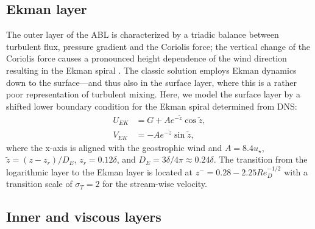 \documentclass[smallcondensed,draft]{svjour3} %
\begin{document}


\subsection{Ekman layer}
\label{sec:ekmanlayer}
The outer layer of the ABL is characterized by a triadic balance between turbulent flux, pressure gradient and the Coriolis force; the vertical change of the Coriolis force causes a pronounced height dependence of the wind direction resulting in the Ekman spiral \citep{ekman:AMA1905}. The classic solution employs Ekman dynamics down to the surface---and thus also in the surface layer, where this is a rather poor representation of turbulent mixing. Here, we model the surface layer by a shifted lower boundary condition for the Ekman spiral determined from DNS:
\begin{subequations}
  \begin{align}
    U_{EK} &= G + Ae^{-\tilde{z}}\cos\tilde{z},\\
		V_{EK} &= - Ae^{-\tilde{z}}\sin\tilde{z},
  \end{align}
\end{subequations}
where the x-axis is aligned with the geostrophic wind and $A = 8.4u_\star$, $\tilde{z} = (z-z_r)/D_E$, $z_r = 0.12\delta$, and $D_E = 3\delta/4\pi\approx 0.24\delta$. The transition from the logarithmic layer to the Ekman layer is located at $z^{-}=0.28- 2.25 Re_{D}^{-1/2}$ with a transition scale of $\sigma_T=2$ for the stream-wise velocity.

\subsection{Inner and viscous layers}
\label{sec:innerlayer}
\end{document}
